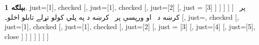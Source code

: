 \documentclass[12pt,a4paper,oneside]{report}
\newenvironment{oltableau}
  {\center\LTR\tableau{}}
  {\endtableau\endLTR\endcenter}
\theoremstyle{definition}
\newtheorem{ex}[thm]{بېلګه}
\begin{document}
\begin{ex}
\begin{oltableau}
    just={\TRule{\False}{\lif}[1]}, checked
    [\sFmla{\False}{\lnot\lforall[x][\formula{A}(x)]},
      just={\TRule{\False}{\lif}[1]}, checked
      [, just={\TRule{\True}{\lexists}[2]}
        [\sFmla{\True}{\lforall[x][\formula{A}(x)]},
          just = {\TRule{\False}{\lnot}[3]}
        ]
      ]
    ]
  ]
]
\end{oltableau}
پر~ کرښه د~\LR{$\TRule{\True}{\lnot}$} او ورپسې پر~ کرښه د
\LR{$\TRule{\True}{\lforall}$} په پلي کولو تړلے تابلو اخلو۔
\begin{oltableau}
[, just=\TAss, checked
  [,
    just={\TRule{\False}{\lif}[1]}, checked
    [\sFmla{\False}{\lnot\lforall[x][\formula{A}(x)]},
      just={\TRule{\False}{\lif}[1]}, checked
      [, just={\TRule{\True}{\lexists}[2]}
        [\sFmla{\True}{\lforall[x][\formula{A}(x)]},
          just = {\TRule{\False}{\lnot}[3]}
          [, just={\TRule{\True}{\lnot}[4]}
            [,
              just={\TRule{\True}{\lforall}[5]}, close
            ]
          ]
        ]
      ]
    ]
  ]
]
\end{oltableau}
\end{ex}
\label{olpseg:OLP-0104-B007:end}
\end{document}

